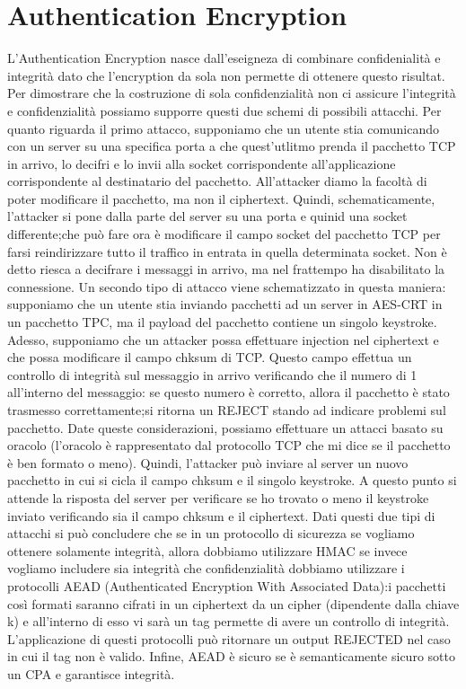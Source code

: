 \documentclass[a4paper,draft]{article}
\begin{document}
\section{Authentication Encryption}
L'Authentication Encryption nasce dall'eseigneza di combinare confidenialità e integrità dato che l'encryption da sola non permette di ottenere questo risultat\@.
Per dimostrare che la costruzione di sola confidenzialità non ci assicure l'integrità e confidenzialità possiamo supporre questi due schemi di possibili attacchi\@.
Per quanto riguarda il primo attacco, supponiamo che un utente stia comunicando con un server su una specifica porta a che quest'utlitmo prenda il pacchetto TCP in arrivo, lo decifri e lo invii alla socket corrispondente all'applicazione corrispondente al destinatario del pacchetto\@. All'attacker diamo la facoltà di poter modificare il pacchetto, ma non il ciphertext\@. Quindi, schematicamente, l'attacker si pone dalla parte del server su una porta e quinid una socket differente;\@quello che può fare ora è modificare il campo socket del pacchetto TCP per farsi reindirizzare tutto il traffico in entrata in quella determinata socket\@. Non è detto riesca a decifrare i messaggi in arrivo, ma nel frattempo ha disabilitato la connessione\@.\newline
Un secondo tipo di attacco viene schematizzato in questa maniera: supponiamo che un utente stia inviando pacchetti ad un server in AES-CRT in un pacchetto TPC, ma il payload del pacchetto contiene un singolo keystroke\@. Adesso, supponiamo che un attacker possa effettuare injection nel ciphertext e che possa modificare il campo chksum di TCP\@. Questo campo effettua un controllo di integrità sul messaggio in arrivo verificando che il numero di 1 all'interno del messaggio: se questo numero è corretto, allora il pacchetto è stato trasmesso correttamente;\@altrminenti si ritorna un REJECT stando ad indicare problemi sul pacchetto\@. Date queste considerazioni, possiamo effettuare un attacci basato su oracolo (l'oracolo è rappresentato dal protocollo TCP che mi dice se il pacchetto è ben formato o meno)\@.\newline
Quindi, l'attacker può inviare al server un nuovo pacchetto in cui si cicla il campo chksum e il singolo keystroke\@. A questo punto si attende la risposta del server per verificare se ho trovato o meno il keystroke inviato verificando sia il campo chksum e il ciphertext\@.\newline
Dati questi due tipi di attacchi si può concludere che se in un protocollo di sicurezza se vogliamo ottenere solamente integrità, allora dobbiamo utilizzare HMAC se invece vogliamo includere sia integrità che confidenzialità dobbiamo utilizzare i protocolli AEAD (Authenticated Encryption With Associated Data):\@ i pacchetti così formati saranno cifrati in un ciphertext da un cipher (dipendente dalla chiave k) e all'interno di esso vi sarà un tag permette di avere un controllo di integrità\@. L'applicazione di questi protocolli può ritornare un output REJECTED nel caso in cui il tag non è valido\@. Infine, AEAD è sicuro se è semanticamente sicuro sotto un CPA e garantisce integrità\@.
\end{document}
